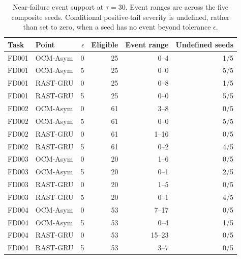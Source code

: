 \begin{table}[!t]
\centering
\scriptsize
\caption{Near-failure event support at $\tau=30$. Event ranges are across the five composite seeds. Conditional positive-tail severity is undefined, rather than set to zero, when a seed has no event beyond tolerance $\epsilon$.}
\label{tab:late-event-support}
\begin{tabular}{llrrrr}
\toprule
Task & Point & $\epsilon$ & Eligible & Event range & Undefined seeds \\
\midrule
FD001 & OCM-Asym & 0 & 25 & 0--4 & 1/5 \\
FD001 & OCM-Asym & 5 & 25 & 0--0 & 5/5 \\
FD001 & RAST-GRU & 0 & 25 & 0--8 & 1/5 \\
FD001 & RAST-GRU & 5 & 25 & 0--0 & 5/5 \\
FD002 & OCM-Asym & 0 & 61 & 3--8 & 0/5 \\
FD002 & OCM-Asym & 5 & 61 & 0--0 & 5/5 \\
FD002 & RAST-GRU & 0 & 61 & 1--16 & 0/5 \\
FD002 & RAST-GRU & 5 & 61 & 0--2 & 4/5 \\
FD003 & OCM-Asym & 0 & 20 & 1--6 & 0/5 \\
FD003 & OCM-Asym & 5 & 20 & 0--1 & 2/5 \\
FD003 & RAST-GRU & 0 & 20 & 1--5 & 0/5 \\
FD003 & RAST-GRU & 5 & 20 & 0--1 & 4/5 \\
FD004 & OCM-Asym & 0 & 53 & 7--17 & 0/5 \\
FD004 & OCM-Asym & 5 & 53 & 0--4 & 1/5 \\
FD004 & RAST-GRU & 0 & 53 & 15--23 & 0/5 \\
FD004 & RAST-GRU & 5 & 53 & 3--7 & 0/5 \\
\bottomrule
\end{tabular}
\end{table}
